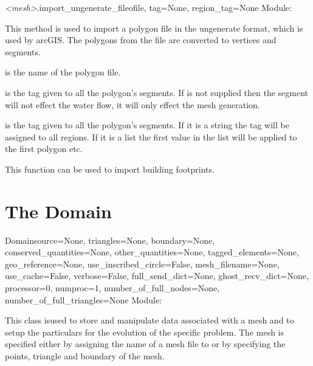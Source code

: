 \documentclass{manual}
\begin{document}
\begin{methoddesc}{\emph{<mesh>}.import_ungenerate_file}{ofile,
                                                         tag=None,
                                                         region_tag=None}
Module: 

This method is used to import a polygon file in the ungenerate format,
which is used by arcGIS. The polygons from the file are converted to
vertices and segments.

 is the name of the polygon file.

 is the tag given to all the polygon's segments.
If  is not supplied then the segment will not effect the water
flow, it will only effect the mesh generation.

 is the tag given to all the polygon's segments.  If
it is a string the tag will be assigned to all regions.  If it
is a list the first value in the list will be applied to the first
polygon etc.

This function can be used to import building footprints.
\end{methoddesc}


\chapter{The Domain}
\label{sec:initialising the domain}

\begin{classdesc}{Domain}{source=None,
                          triangles=None,
                          boundary=None,
                          conserved_quantities=None,
                          other_quantities=None,
                          tagged_elements=None,
                          geo_reference=None,
                          use_inscribed_circle=False,
                          mesh_filename=None,
                          use_cache=False,
                          verbose=False,
                          full_send_dict=None,
                          ghost_recv_dict=None,
                          processor=0,
                          numproc=1,
                          number_of_full_nodes=None,
                          number_of_full_triangles=None}
Module: 

This class isused to
store and manipulate data associated with a mesh and to setup the particulars for
the evolution of the specific problem. The mesh is
specified either by assigning the name of a mesh file to
 or by specifying the points, triangle and boundary of the
mesh.
\end{classdesc}
\end{document}
